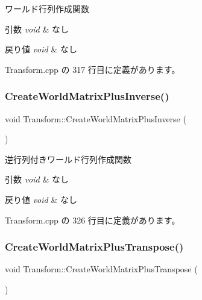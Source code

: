 ワールド行列作成関数 


\begin{DoxyParams}{引数}
{\em void} & なし \\
\hline
\end{DoxyParams}

\begin{DoxyRetVals}{戻り値}
{\em void} & なし \\
\hline
\end{DoxyRetVals}


 Transform.\+cpp の 317 行目に定義があります。

\mbox{\label{class_transform_a26e42d4a1bd35070277b49a48ef5c4fd}} 
\subsubsection{\texorpdfstring{Create\+World\+Matrix\+Plus\+Inverse()}{CreateWorldMatrixPlusInverse()}}
{\footnotesize\ttfamily void Transform\+::\+Create\+World\+Matrix\+Plus\+Inverse (\begin{DoxyParamCaption}{ }\end{DoxyParamCaption})}



逆行列付きワールド行列作成関数 


\begin{DoxyParams}{引数}
{\em void} & なし \\
\hline
\end{DoxyParams}

\begin{DoxyRetVals}{戻り値}
{\em void} & なし \\
\hline
\end{DoxyRetVals}


 Transform.\+cpp の 326 行目に定義があります。

\mbox{\label{class_transform_a49d2df9c3ffffa21e2df60ce2f531bca}} 
\subsubsection{\texorpdfstring{Create\+World\+Matrix\+Plus\+Transpose()}{CreateWorldMatrixPlusTranspose()}}
{\footnotesize\ttfamily void Transform\+::\+Create\+World\+Matrix\+Plus\+Transpose (\begin{DoxyParamCaption}{ }\end{DoxyParamCaption})}




